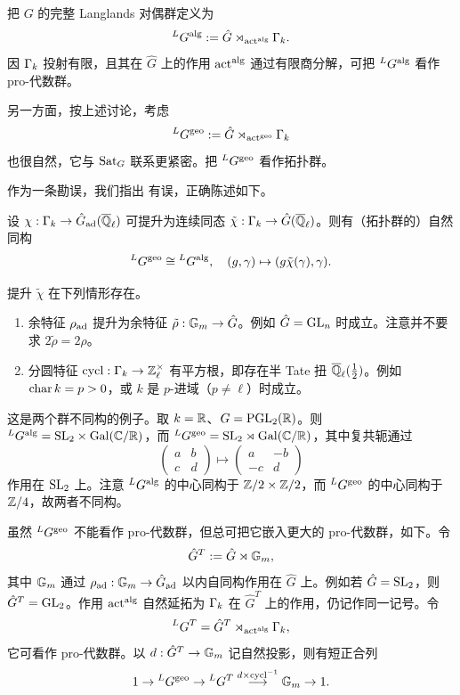 把 $G$ 的完整 Langlands 对偶群定义为
\[{^L}G^{\operatorname{alg}}:= \hat G\rtimes_{\operatorname{act}^{\operatorname{alg}}}{\Gamma}_k.\]
因 ${\Gamma}_k$ 投射有限，且其在 $\hat G$ 上的作用 $\operatorname{act}^{\operatorname{alg}}$ 通过有限商分解，可把 ${^L}G^{\operatorname{alg}}$ 看作 pro-代数群。

另一方面，按上述讨论，考虑
\[{^L}G^{\operatorname{geo}}:= \hat G\rtimes_{\operatorname{act}^{\operatorname{geo}}}{\Gamma}_k\]
也很自然，它与 ${\operatorname{Sat}}_G$ 联系更紧密。把 ${^L}G^{\operatorname{geo}}$ 看作拓扑群。

作为一条勘误，我们指出 \cite[Corollary A.8]{RZ} 有误，正确陈述如下。

\begin{lem}\label{geom Langlands dual}
设 $\chi: {\Gamma}_k\to \hat G_{\operatorname{ad}}({\overline{{\mathbb Q}}_\ell})$ 可提升为连续同态 $\tilde \chi:{\Gamma}_k\to \hat G({\overline{{\mathbb Q}}_\ell})$。则有（拓扑群的）自然同构
\[{^L}G^{\operatorname{geo}}\cong{^L}G^{\operatorname{alg}},\quad (g,{\gamma})\mapsto (g\tilde\chi({\gamma}),{\gamma}).\]
\end{lem}

\begin{rmk}\label{lifting condition}
提升 $\tilde \chi$ 在下列情形存在。
\begin{enumerate}
\item[(i)] 余特征 $\rho_{\operatorname{ad}}$ 提升为余特征 $\tilde \rho: {\mathbb G}_m\to \hat G$。例如 $\hat G={\operatorname{GL}}_n$ 时成立。注意并不要求 $2\tilde \rho=2\rho$。
\item[(ii)] 分圆特征 $\operatorname{cycl}: {\Gamma}_k\to {\mathbb Z}_\ell^\times$ 有平方根，即存在半 Tate 扭 ${\overline{{\mathbb Q}}_\ell}(\frac{1}{2})$。例如 $\operatorname{char} k=p>0$，或 $k$ 是 $p$-进域（$p\neq \ell$）时成立。
\end{enumerate}
\end{rmk}

\begin{ex}\label{geom v.s. alg dual}
这是两个群不同构的例子。取 $k={\mathbb R}$、$G=\operatorname{PGL}_2({\mathbb R})$。则 ${^L}G^{\operatorname{alg}}={\operatorname{SL}}_2\times {\operatorname{Gal}}({\mathbb C}/{\mathbb R})$，而 ${^L}G^{\operatorname{geo}}={\operatorname{SL}}_2\rtimes {\operatorname{Gal}}({\mathbb C}/{\mathbb R})$，其中复共轭通过
\[\begin{pmatrix} a & b\\ c & d \end{pmatrix}\mapsto \begin{pmatrix} a & -b\\ -c & d \end{pmatrix}\]
作用在 ${\operatorname{SL}}_2$ 上。注意 ${^L}G^{\operatorname{alg}}$ 的中心同构于 ${\mathbb Z}/2\times {\mathbb Z}/2$，而 ${^L}G^{\operatorname{geo}}$ 的中心同构于 ${\mathbb Z}/4$，故两者不同构。
\end{ex}

虽然 ${^L}G^{\operatorname{geo}}$ 不能看作 pro-代数群，但总可把它嵌入更大的 pro-代数群，如下。令
\begin{equation}\label{Deligne modification}
\hat G^T:=\hat G\rtimes{\mathbb G}_m,
\end{equation}
其中 ${\mathbb G}_m$ 通过 $\rho_{\operatorname{ad}}:{\mathbb G}_m\to \hat G_{\operatorname{ad}}$ 以内自同构作用在 $\hat G$ 上。例如若 $\hat G={\operatorname{SL}}_2$，则 $\hat G^T={\operatorname{GL}}_2$。作用 $\operatorname{act}^{\operatorname{alg}}$ 自然延拓为 ${\Gamma}_k$ 在 $\hat G^T$ 上的作用，仍记作同一记号。令
\[{^L} G^T=\hat G^T\rtimes_{\operatorname{act}^{\operatorname{alg}}}{\Gamma}_k,\]
它可看作 pro-代数群。以 $d: \hat G^T\to {\mathbb G}_m$ 记自然投影，则有短正合列
\[1\to {^L}G^{\operatorname{geo}}\to {^L}G^T\stackrel{d\times \operatorname{cycl}^{-1}}{\longrightarrow}{\mathbb G}_m\to 1.\]

